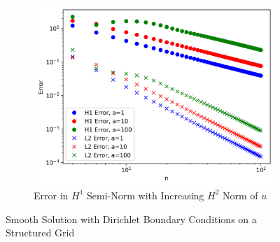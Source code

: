 \documentclass[11pt,a4paper]{article}
\begin{document}
\begin{figure}
\begin{subfigure}{.8\textwidth}
    \centering
    \includegraphics[width=.9\linewidth]{errors_smooth_regular}
    \caption{Error in $H^1$ Semi-Norm with Increasing $H^2$ Norm of $u$}
  \end{subfigure}
  \label{fig:smooth_dirichlet_h1_err}
  \caption{Smooth Solution with Dirichlet Boundary Conditions on a Structured Grid}
\end{figure}
\end{document}

